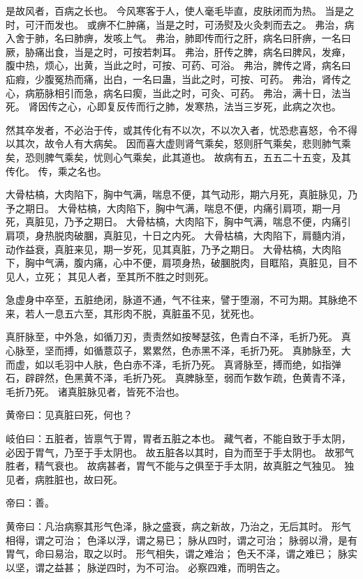 \documentclass{article}%
\begin{document}
是故风者，百病之长也。
今风寒客于人，使人毫毛毕直，皮肤闭而为热。
当是之时，可汗而发也。
或痹不仁肿痛，当是之时，可汤熨及火灸刺而去之。
弗治，病入舍于肺，名曰肺痹，发咳上气。
弗治，肺即传而行之肝，病名曰肝痹，一名曰厥，胁痛出食，当是之时，可按若刺耳。
弗治，肝传之脾，病名曰脾风，发瘅，腹中热，烦心，出黄，当此之时，可按、可药、可浴。
弗治，脾传之肾，病名曰疝瘕，少腹冤热而痛，出白，一名曰蛊，当此之时，可按、可药。
弗治，肾传之心，病筋脉相引而急，病名曰瘈，当此之时，可灸、可药。
弗治，满十日，法当死。
肾因传之心，心即复反传而行之肺，发寒热，法当三岁死，此病之次也。

然其卒发者，不必治于传，或其传化有不以次，不以次入者，忧恐悲喜怒，令不得以其次，故令人有大病矣。
因而喜大虚则肾气乘矣，怒则肝气乘矣，悲则肺气乘矣，恐则脾气乘矣，忧则心气乘矣，此其道也。
故病有五，五五二十五变，及其传化。
传，乘之名也。

大骨枯槁，大肉陷下，胸中气满，喘息不便，其气动形，期六月死，真脏脉见，乃予之期日。
大骨枯槁，大肉陷下，胸中气满，喘息不便，内痛引肩项，期一月死，真脏见，乃予之期日。
大骨枯槁，大肉陷下，胸中气满，喘息不便，内痛引肩项，身热脱肉破䐃，真脏见，十日之内死。
大骨枯槁，大肉陷下，肩髓内消，动作益衰，真脏来见，期一岁死，见其真脏，乃予之期日。
大骨枯槁，大肉陷下，胸中气满，腹内痛，心中不便，肩项身热，破䐃脱肉，目眶陷，真脏见，目不见人，立死；
其见人者，至其所不胜之时则死。

急虚身中卒至，五脏绝闭，脉道不通，气不往来，譬于堕溺，不可为期。其脉绝不来，若人一息五六至，其形肉不脱，真脏虽不见，犹死也。

真肝脉至，中外急，如循刀刃，责责然如按琴瑟弦，色青白不泽，毛折乃死。
真心脉至，坚而搏，如循薏苡子，累累然，色赤黑不泽，毛折乃死。
真肺脉至，大而虚，如以毛羽中人肤，色白赤不泽，毛折乃死。
真肾脉至，搏而绝，如指弹石，辟辟然，色黑黄不泽，毛折乃死。
真脾脉至，弱而乍数乍疏，色黄青不泽，毛折乃死。
诸真脏脉见者，皆死不治也。

黄帝曰：见真脏曰死，何也？

岐伯曰：五脏者，皆禀气于胃，胃者五脏之本也。
藏气者，不能自致于手太阴，必因于胃气，乃至于手太阴也。
故五脏各以其时，自为而至于手太阴也。
故邪气胜者，精气衰也。
故病甚者，胃气不能与之俱至于手太阴，故真脏之气独见。
独见者，病胜脏也，故曰死。

帝曰：善。

黄帝曰：凡治病察其形气色泽，脉之盛衰，病之新故，乃治之，无后其时。
形气相得，谓之可治；
色泽以浮，谓之易已；
脉从四时，谓之可治；
脉弱以滑，是有胃气，命曰易治，取之以时。
形气相失，谓之难治；
色夭不泽，谓之难已；
脉实以坚，谓之益甚；
脉逆四时，为不可治。
必察四难，而明告之。
\end{document}
